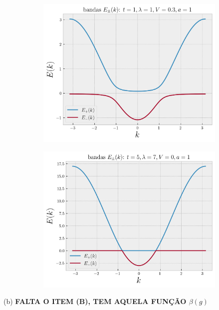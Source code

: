 \documentclass[a4paper,10pt]{article}
\begin{document}
\begin{figure}[H]
\centering
\begin{subfigure}{.46\textwidth}
  \centering
  \includegraphics[width=0.95\linewidth]{fig/bandas-anderson3.png}
  \label{fig:bandas-anderson3}
\end{subfigure}
\begin{subfigure}{.46\textwidth}
  \centering
  \includegraphics[width=0.95\linewidth]{fig/bandas-anderson4.png}
  \label{fig:bandas-anderson4}
\end{subfigure}
\label{fig:bandas-anderson12}
\end{figure}

(b) \textbf{FALTA O ITEM (B), TEM AQUELA FUNÇÃO $\beta(g)$}
\end{document}
